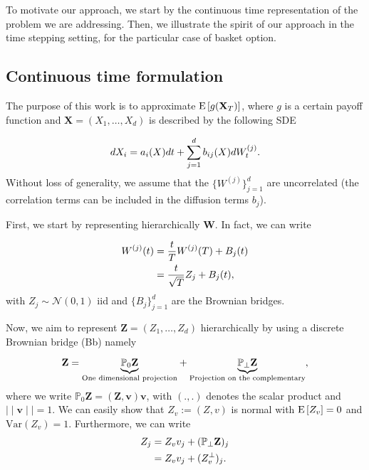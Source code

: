 To motivate our approach, we start  by the continuous time representation of the problem we are addressing. Then, we illustrate the spirit of our approach in the time stepping setting, for the particular case of basket option.
\subsection{Continuous time formulation}

The purpose of this work is to approximate $\mathrm{E}\left[g(\mathbf{X}_T)\right]$, where $g$ is a certain payoff function and $\mathbf{X}=(X_1, \dots, X_d)$ is described by the following SDE

\begin{equation}\label{eq:SDE_interest}
dX_i=a_i(X) dt + \sum_{j=1}^d b_{ij}(X) dW_t^{(j)} .
\end{equation}
Without  loss of generality, we assume that the $\{W^{(j)}\}_{j=1}^d$ are uncorrelated (the correlation terms can be included  in the diffusion terms $b_j$).

First, we start by representing hierarchically $\mathbf{W}$. In fact, we can write 

\begin{align}
W^{(j)}(t)&= \frac{t}{T} W^{(j)}(T)+B_j(t) \nonumber\\
&= \frac{t}{\sqrt{T}} Z_j+B_j(t),
\end{align}
with $Z_j \sim \mathcal{N}(0,1)$ iid and $\{B_j\}_{j=1}^d$ are the Brownian bridges.

Now, we aim to represent $\mathbf{Z}=(Z_1,\dots,Z_d)$ hierarchically by using a discrete Brownian bridge (Bb) namely

\begin{equation}\label{eq:smoothing_decomposition}
\mathbf{Z}= \underset{\text{One dimensional projection}}{\underbrace{\mathbb{P}_0 \mathbf{Z}}} +  \underset{\text{Projection on the complementary}} {\underbrace{\mathbb{P}_{\perp} \mathbf{Z}}},
\end{equation} 
where we write $\mathbb{P}_0 \mathbf{Z}=(\mathbf{Z}, \mathbf{v}) \mathbf{v}$, with $(.,.)$ denotes the scalar product and $\mid \mid \mathbf{v} \mid \mid=1$. We can easily show that $Z_v:=(Z,v)$ is normal with $\mathrm{E}\left[Z_v\right]=0$ and $\text{Var}(Z_v)=1$. Furthermore, we can write
\begin{align}\label{eq:smoothing_decomposition_componentwise}
Z_j&=Z_v v_j+ (\mathbb{P}_{\perp} \mathbf{Z})_j\nonumber \\
&=Z_v v_j+ (Z_v^\perp)_j .
\end{align}

